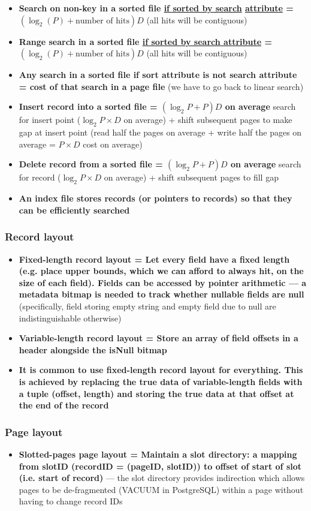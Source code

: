 \documentclass[20pt,a4paper,landscape]{extarticle}
\begin{document}
\begin{flushleft}
\begin{itemize}
\item \textbf{Search on non-key in a sorted file \underline{if sorted by search} \underline{attribute} = \boldmath$(\log_2(P) + \textrm{number of hits})D$} (all hits will be contiguous)
\item \textbf{Range search in a sorted file \underline{if sorted by search attribute} = \boldmath$(\log_2(P) + \textrm{number of hits})D$} (all hits will be contiguous)
\item \textbf{Any search in a sorted file if sort attribute is not search attribute = cost of that search in a page file} (we have to go back to linear search)
\item \textbf{Insert record into a sorted file = \boldmath$(\log_2 P + P)D$ on average} search for insert point ($\log_2 P \times D$ on average) + shift subsequent pages to make gap at insert point (read half the pages on average + write half the pages on average = $P \times D$ cost on average)
\item \textbf{Delete record from a sorted file = \boldmath$(\log_2 P + P)D$ on average} search for record ($\log_2 P \times D$ on average) + shift subsequent pages to fill gap
\item \textbf{An index file stores records (or pointers to records) so that they can be efficiently searched}
\end{itemize}
\clearpage
\subsubsection{Record layout}
\begin{itemize}
\item \textbf{Fixed-length record layout = Let every field have a fixed length (e.g. place upper bounds, which we can afford to always hit, on the size of each field). Fields can be accessed by pointer arithmetic --- a metadata bitmap is needed to track whether nullable fields are null} (specifically, field storing empty string and empty field due to null are indistinguishable otherwise)
\item \textbf{Variable-length record layout = Store an array of field offsets in a header alongside the isNull bitmap}
\item \textbf{It is common to use fixed-length record layout for everything. This is achieved by replacing the true data of variable-length fields with a tuple (offset, length) and storing the true data at that offset at the end of the record}
\end{itemize}
\subsubsection{Page layout}
\begin{itemize}
\item \textbf{Slotted-pages page layout = Maintain a slot directory: a mapping from slotID (recordID = (pageID, slotID)) to offset of start of slot (i.e. start of record)} --- the slot directory provides indirection which allows pages to be de-fragmented (VACUUM in PostgreSQL) within a page without having to change record IDs
\end{itemize}
\clearpage

\end{flushleft}
\end{document}
